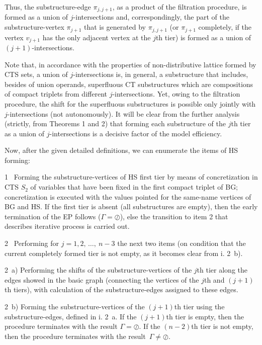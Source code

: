 \documentclass[12pt, a4paper]{article}
\begin{document}
Thus, the substructure-edge $\pi_{j,j+1}$, as a product of the filtration procedure, is formed as a union of  $j$-intersections and, correspondingly, the part of the substructure-vertex $\pi_{j+1}$ that is generated by $\pi_{j,j+1}$ (or $\pi_{j+1}$ completely, if the vertex $v_{j+1}$ has the only adjacent vertex at the $j$th  tier) is formed as a union of $(j+1)$-intersections.

Note that, in accordance with the properties of non-distributive lattice formed by CTS sets, a union of  $j$-intersections is, in general, a substructure that includes, besides of union operands, superfluous CT substructures which are compositions of compact triplets from different $j$-intersections. Yet, owing to the filtration procedure, the shift for the superfluous substructures is possible only jointly with $j$-intersections (not autonomously). It will be clear from the further analysis (strictly, from Theorems 1 and 2) that forming each substructure of the $j$th tier as a union of  $j$-intersections is a decisive factor of the model efficiency.

\medskip
Now, after the given detailed definitions, we can enumerate the items of HS forming:

\hangindent=1.1cm
1 \  Forming the substructure-vertices of HS first tier by means of concretization in CTS $S_2$ of variables that have been fixed in the first compact triplet of BG; concretization is executed with the values pointed for the same-name vertices of BG and HS. If the first tier is absent (all substructures are empty), then the early termination of the EP follows ($\Gamma=\oslash$), else the transition to item 2 that describes iterative process is carried out.

\hangindent=1.1cm
2 \  Performing for $j=1, 2, \,\dots,\ n-3$ the next two items (on condition that the current completely formed tier is not empty, as it becomes clear from i. 2\  b).

\hangindent=1.5cm
2\ a)  Performing  the  shifts  of  the substructure-vertices  of  the  $j$th  tier along  the edges  showed in the basic graph (connecting the vertices of  the  $j$th  and  $(j+1)$th  tiers), with calculation of the substructure-edges assigned to these edges.

\hangindent=1.5cm
2\ b)  Forming the substructure-vertices of the $(j+1)$th  tier using the substructure-edges, defined in i. 2\ a. If the $(j+1)$th tier is empty, then the procedure terminates with the result $\Gamma=\oslash$. If the $(n-2)$th tier is not empty, then the procedure terminates with the result~$\Gamma\ne \oslash$.
\end{document}
